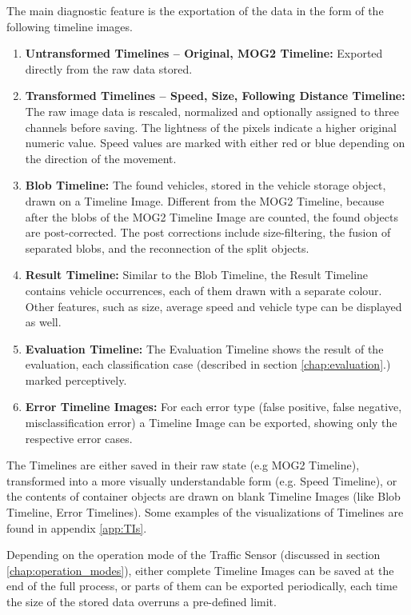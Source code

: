 The main diagnostic feature is the exportation of the data in the form of the following timeline images.
\begin{enumerate}
	\item \textbf{Untransformed Timelines -- Original, MOG2 Timeline: } Exported directly from the raw data stored.
	\item \textbf{Transformed Timelines -- Speed, Size, Following Distance Timeline: } The raw image data is rescaled, normalized and optionally assigned to three channels before saving. The lightness of the pixels indicate a higher original numeric value. Speed values are marked with either red or blue depending on the direction of the movement. 
	\item \textbf{Blob Timeline: } The found vehicles, stored in the vehicle storage object, drawn on a Timeline Image. Different from the MOG2 Timeline, because after the blobs of the MOG2 Timeline Image are counted, the found objects are post-corrected. The post corrections include size-filtering, the fusion of separated blobs, and the reconnection of the split objects.
	\item \textbf{Result Timeline: } Similar to the Blob Timeline, the Result Timeline contains vehicle occurrences, each of them drawn with a separate colour. Other features, such as size, average speed and vehicle type can be displayed as well.
	\item \textbf{Evaluation Timeline: } The Evaluation Timeline shows the result of the evaluation, each classification case (described in section \ref{chap:evaluation}.) marked perceptively.
	\item \textbf{Error Timeline Images: } For each error type (false positive, false negative, misclassification error) a Timeline Image can be exported, showing only the respective error cases.
\end{enumerate} 
The Timelines are either saved in their raw state (e.g MOG2 Timeline), transformed into a more visually understandable form (e.g. Speed Timeline), or the contents of container objects are drawn on blank Timeline Images (like Blob Timeline, Error Timelines).
Some examples of the visualizations of Timelines are found in appendix \ref{app:TIs}.

Depending on the operation mode of the Traffic Sensor (discussed in section \ref{chap:operation_modes}), either complete Timeline Images can be saved at the end of the full process, or parts of them can be exported periodically, each time the size of the stored data overruns a pre-defined limit.

